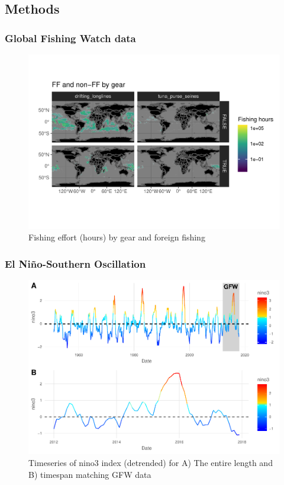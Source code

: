 \documentclass[11pt]{article}
\begin{document}
\subsection{Methods}

\subsubsection{Global Fishing Watch data}

\begin{figure}
\centering
\includegraphics{img/unnamed-chunk-3-1.pdf}
\caption{Fishing effort (hours) by gear and foreign fishing}
\end{figure}


\subsubsection{El Ni\~{n}o-Southern Oscillation}

\begin{figure}
\centering
\includegraphics{img/unnamed-chunk-5-1.pdf}
\caption{Timeseries of nino3 index (detrended) for A) The entire length
and B) timespan matching GFW data}
\end{figure}
\end{document}
